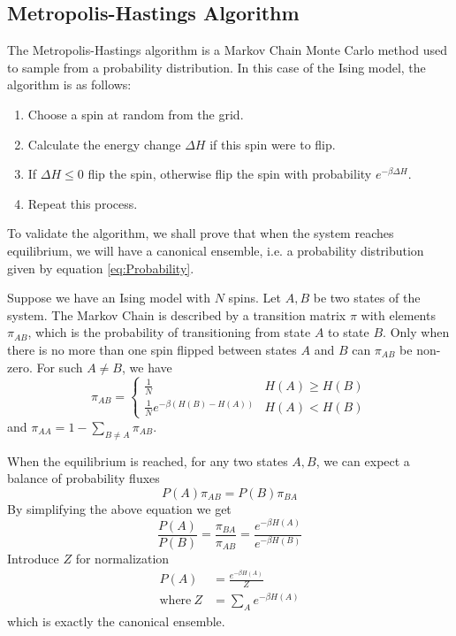 \documentclass[11pt]{article}
\begin{document}
	\subsection{Metropolis-Hastings Algorithm}
	\label{metropolis_algorithm}
	
	The Metropolis-Hastings algorithm is a Markov Chain Monte Carlo method used to sample from a probability distribution. In this case of the Ising model, the algorithm is as follows:
	\begin{enumerate}
		\item Choose a spin at random from the grid.
		\item Calculate the energy change $\Delta H$ if this spin were to flip.
		\item If $\Delta H \leq 0$ flip the spin, otherwise flip the spin with probability $e^{-\beta\Delta H}$.
		\item Repeat this process.
	\end{enumerate}

	To validate the algorithm, we shall prove that when the system reaches equilibrium, we will have a canonical ensemble, i.e. a probability distribution given by equation \eqref{eq:Probability}.
	
	Suppose we have an Ising model with $N$ spins. Let $A, B$ be two states of the system. The Markov Chain is described by a transition matrix $\pi$ with elements $\pi_{AB}$, which is the probability of transitioning from state $A$ to state $B$. Only when there is no more than one spin flipped between states $A$ and $B$ can $\pi_{AB}$ be non-zero. For such $A \neq B$, we have
	\begin{equation}
		\pi_{AB} = \begin{cases}
			\frac{1}{N} & H(A) \geq H(B) \\
			\frac{1}{N} e^{-\beta(H(B) - H(A))} & H(A) < H(B)
		\end{cases}
	\end{equation}
	and $\pi_{AA} = 1 - \sum_{B \neq A} \pi_{AB}$.

	When the equilibrium is reached, for any two states $A, B$, we can expect a balance of probability fluxes
	\begin{equation}
		P(A) \pi_{AB} = P(B) \pi_{BA}
	\end{equation}
	By simplifying the above equation we get
	\begin{equation}
		\frac{P(A)}{P(B)} = \frac{\pi_{BA}}{\pi_{AB}} = \frac{e^{-\beta H(A)}}{e^{-\beta H(B)}}
	\end{equation}
	Introduce $Z$ for normalization
	\begin{equation}
		\begin{aligned}
			P(A) &= \frac{e^{-\beta H(A)}}{Z} \\
			\text{where}\ Z &= \sum_A e^{-\beta H(A)}
		\end{aligned}
	\end{equation}
	which is exactly the canonical ensemble.
\end{document}
